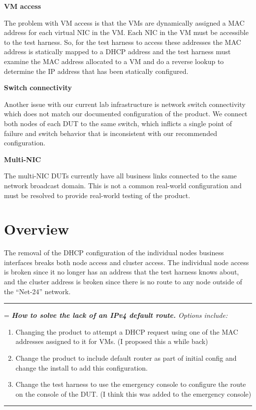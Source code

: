 \documentclass[twoside]{article}
\newenvironment{note}
{\begin{center}\begin{minipage}{0.8\textwidth}
\vspace{2ex}\hrule\vspace{1ex}
\parskip=\medskipamount
\em}
{\par 
\vspace{1ex}\hrule\vspace{2ex}
\end{minipage}\end{center}}
\begin{document}
{\bf VM access}

The problem with VM access is that the VMs are dynamically assigned a MAC address
for each virtual NIC in the VM.
Each NIC in the VM must be accessible to the test harness.
So, for the test harness to access these addresses the MAC address is
statically mapped to a DHCP address and the test harness must examine
the MAC address allocated to a VM and do a reverse lookup to determine
the IP address that has been statically configured.

{\bf Switch connectivity}

Another issue with our current lab infrastructure is network switch connectivity
which does not match our documented configuration of the product.
We connect both nodes of each DUT to the same switch, which inflicts a single
point of failure and switch behavior that is inconsistent with our recommended
configuration.

{\bf Multi-NIC}

The multi-NIC DUTs currently have all business links connected to the same
network broadcast domain.
This is not a common real-world configuration and must be resolved to provide
real-world testing of the product.

\section{Overview}

The removal of the DHCP configuration of the individual nodes business
interfaces breaks both node access and cluster access.
The individual node access is broken since it no longer has an address
that the test harness knows about,
and the cluster address is broken since there is no route to any node
outside of the ``Net-24'' network.

\begin{note}
{\bf How to solve the lack of an IPv4 default route.}
Options include:
\begin{enumerate}
\item Changing the product to attempt a DHCP request using one of the MAC addresses
assigned to it for VMs. (I proposed this a while back)
\item Change the product to include default router as part of initial config
and change the install to add this configuration.
\item Change the test harness to use the emergency console to configure the
route on the console of the DUT.  (I think this was added to the emergency console)
\end{enumerate}
\end{note}
\end{document}

